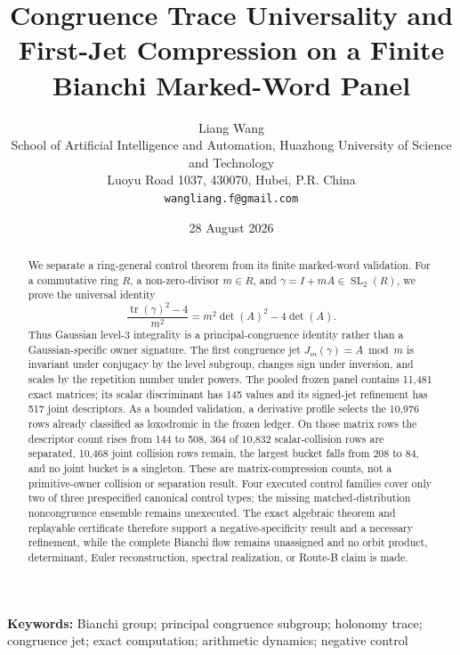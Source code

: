\documentclass[11pt,a4paper]{article}
\title{Congruence Trace Universality and First-Jet Compression on a Finite Bianchi Marked-Word Panel}
\author{Liang Wang\\
\small School of Artificial Intelligence and Automation, Huazhong University of Science and Technology\\
\small Luoyu Road 1037, 430070, Hubei, P.R. China\\
\small \texttt{wangliang.f@gmail.com}}
\date{28 August 2026}
\theoremstyle{definition}
\theoremstyle{remark}
\newcommand{\SL}{\operatorname{SL}}
\newcommand{\tr}{\operatorname{tr}}
\begin{document}
\maketitle

\begin{abstract}
We separate a ring-general control theorem from its finite marked-word validation. For a commutative ring \(R\), a non-zero-divisor \(m\in R\), and \(\gamma=I+mA\in\SL_2(R)\), we prove the universal identity
\[
  \frac{\tr(\gamma)^2-4}{m^2}=m^2\det(A)^2-4\det(A).
\]
Thus Gaussian level-\(3\) integrality is a principal-congruence identity rather than a Gaussian-specific owner signature. The first congruence jet \(J_m(\gamma)=A\bmod m\) is invariant under conjugacy by the level subgroup, changes sign under inversion, and scales by the repetition number under powers. The pooled frozen panel contains 11,481 exact matrices; its scalar discriminant has 145 values and its signed-jet refinement has 517 joint descriptors. As a bounded validation, a derivative profile selects the 10,976 rows already classified as loxodromic in the frozen ledger. On those matrix rows the descriptor count rises from 144 to 508, 364 of 10,832 scalar-collision rows are separated, 10,468 joint collision rows remain, the largest bucket falls from 208 to 84, and no joint bucket is a singleton. These are matrix-compression counts, not a primitive-owner collision or separation result. Four executed control families cover only two of three prespecified canonical control types; the missing matched-distribution noncongruence ensemble remains unexecuted. The exact algebraic theorem and replayable certificate therefore support a negative-specificity result and a necessary refinement, while the complete Bianchi flow remains unassigned and no orbit product, determinant, Euler reconstruction, spectral realization, or Route-B claim is made.
\end{abstract}

\noindent\textbf{Keywords:} Bianchi group; principal congruence subgroup; holonomy trace; congruence jet; exact computation; arithmetic dynamics; negative control
\end{document}

